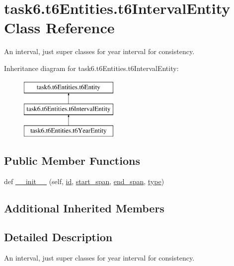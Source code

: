 \hypertarget{classtask6_1_1t6Entities_1_1t6IntervalEntity}{}\section{task6.\+t6\+Entities.\+t6\+Interval\+Entity Class Reference}
\label{classtask6_1_1t6Entities_1_1t6IntervalEntity}


An interval, just super classes for year interval for consistency.  


Inheritance diagram for task6.\+t6\+Entities.\+t6\+Interval\+Entity\+:\begin{figure}[H]
\begin{center}
\leavevmode
\includegraphics[height=3.000000cm]{classtask6_1_1t6Entities_1_1t6IntervalEntity}
\end{center}
\end{figure}
\subsection*{Public Member Functions}
\begin{DoxyCompactItemize}
\item 
def \hyperlink{classtask6_1_1t6Entities_1_1t6IntervalEntity_a6ddff3e7ac8e0049efcbd53db951445a}{\+\_\+\+\_\+init\+\_\+\+\_\+} (self, \hyperlink{classtask6_1_1t6Entities_1_1t6Entity_a96b2e7fb553c920ab2db6f6deb31e3b4}{id}, \hyperlink{classtask6_1_1t6Entities_1_1t6Entity_a8221c36d2995a24200cdfbd74cc9233c}{start\+\_\+span}, \hyperlink{classtask6_1_1t6Entities_1_1t6Entity_a597d42bb02fc9f42277098f0ce21917c}{end\+\_\+span}, \hyperlink{classtask6_1_1t6Entities_1_1t6Entity_af0496eb852234bb168ab22d031c99ed3}{type})
\end{DoxyCompactItemize}
\subsection*{Additional Inherited Members}


\subsection{Detailed Description}
An interval, just super classes for year interval for consistency. 

